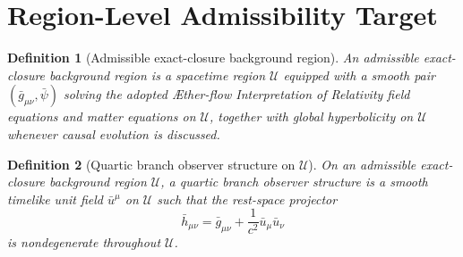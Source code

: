 \documentclass[11pt]{article}
\newcommand{\Aflow}{\AE{}ther-flow}
\newcommand{\TheoryName}{\Aflow{} Interpretation of Relativity}
\newtheorem{definition}{Definition}
\begin{document}
\section{Region-Level Admissibility Target}

\begin{definition}[Admissible exact-closure background region]
An admissible exact-closure background region is a spacetime region \(\mathcal U\) equipped with a smooth pair \((\bar g_{\mu\nu},\bar\psi)\) solving the adopted \TheoryName{} field equations and matter equations on \(\mathcal U\), together with global hyperbolicity on \(\mathcal U\) whenever causal evolution is discussed.
\end{definition}

\begin{definition}[Quartic branch observer structure on \(\mathcal U\)]
On an admissible exact-closure background region \(\mathcal U\), a quartic branch observer structure is a smooth timelike unit field \(\bar u^\mu\) on \(\mathcal U\) such that the rest-space projector
\begin{equation}
\bar h_{\mu\nu}
=
\bar g_{\mu\nu}
+\frac{1}{c^2}\bar u_\mu \bar u_\nu
\label{eq:restprojector}
\end{equation}
is nondegenerate throughout \(\mathcal U\).
\end{definition}
\end{document}
